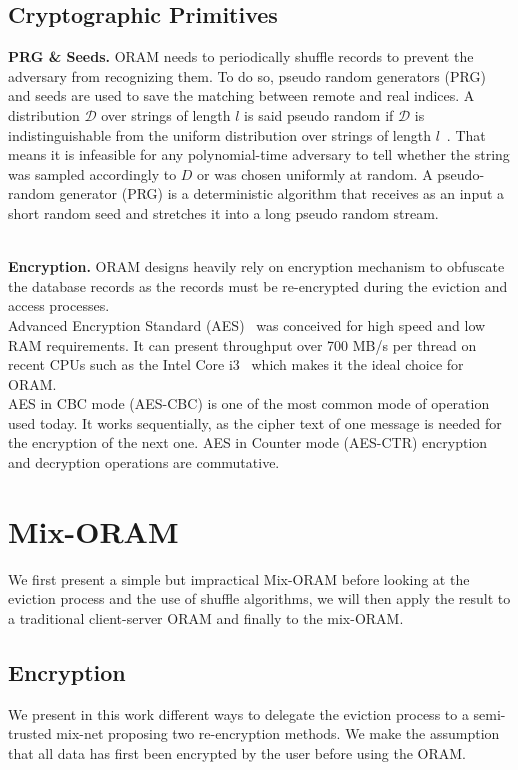 \documentclass[USenglish,oneside,twocolumn]{article}
\begin{document}
\subsection{Cryptographic Primitives}
\noindent\textbf{PRG \& Seeds.}
ORAM needs to periodically shuffle records to prevent the adversary from recognizing them. To do so, pseudo random generators (PRG) and seeds are used to save the matching between remote and real indices. A distribution $\mathcal{D}$ over strings of length $l$ is said pseudo random if $\mathcal{D}$ is indistinguishable from the uniform distribution over strings of length $l$~\cite{katz2014introduction}. That means it is infeasible for any polynomial-time adversary to tell whether the string was sampled accordingly to $D$ or was chosen uniformly at random. A pseudo-random generator (PRG) is a deterministic algorithm that receives as an input a short random seed and stretches it into a long pseudo random stream.\\\

\noindent\textbf{Encryption.}
ORAM designs heavily rely on encryption mechanism to obfuscate the database records as the records must be re-encrypted during the eviction and access processes.\\
Advanced Encryption Standard (AES)~\cite{daemen2013design} was conceived for high speed and low RAM requirements. It can present throughput over 700 MB/s per thread on recent CPUs such as the Intel Core i3~\cite{mcwilliams2014hardware} which makes it the ideal choice for ORAM.\\
AES in CBC mode (AES-CBC) is one of the most common mode of operation used today. It works sequentially, as the cipher text of one message is needed for the encryption of the next one. 
AES in Counter mode (AES-CTR) encryption and decryption operations are commutative.
%
\section{Mix-ORAM}\label{Mix-ORAM}
We first present a simple but impractical Mix-ORAM before looking at the eviction process and the use of shuffle algorithms, we will then apply the result to a traditional client-server ORAM and finally to the mix-ORAM.
%
\subsection{Encryption}\label{Enc}
We present in this work different ways to delegate the eviction process to a semi-trusted mix-net proposing two re-encryption methods.
We make the assumption that all data has first been encrypted by the user before using the ORAM. \\
\end{document}
